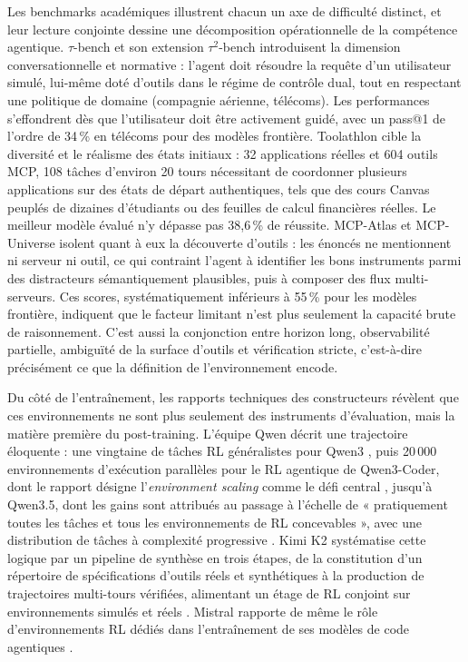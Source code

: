 \documentclass[11pt,a4paper]{article}
\begin{document}
Les benchmarks académiques illustrent chacun un axe de difficulté distinct, et leur lecture conjointe dessine une décomposition opérationnelle de la compétence agentique. $\tau$-bench et son extension $\tau^2$-bench \cite{taubench2024, tau2bench2025} introduisent la dimension conversationnelle et normative : l'agent doit résoudre la requête d'un utilisateur simulé, lui-même doté d'outils dans le régime de contrôle dual, tout en respectant une politique de domaine (compagnie aérienne, télécoms). Les performances s'effondrent dès que l'utilisateur doit être activement guidé, avec un pass@1 de l'ordre de 34\,\% en télécoms pour des modèles frontière. Toolathlon \cite{toolathlon2025} cible la diversité et le réalisme des états initiaux : 32 applications réelles et 604 outils MCP, 108 tâches d'environ 20 tours nécessitant de coordonner plusieurs applications sur des états de départ authentiques, tels que des cours Canvas peuplés de dizaines d'étudiants ou des feuilles de calcul financières réelles. Le meilleur modèle évalué n'y dépasse pas 38,6\,\% de réussite. MCP-Atlas \cite{mcpatlas2026} et MCP-Universe \cite{mcpuniverse2025} isolent quant à eux la découverte d'outils : les énoncés ne mentionnent ni serveur ni outil, ce qui contraint l'agent à identifier les bons instruments parmi des distracteurs sémantiquement plausibles, puis à composer des flux multi-serveurs. Ces scores, systématiquement inférieurs à 55\,\% pour les modèles frontière, indiquent que le facteur limitant n'est plus seulement la capacité brute de raisonnement. C'est aussi la conjonction entre horizon long, observabilité partielle, ambiguïté de la surface d'outils et vérification stricte, c'est-à-dire précisément ce que la définition de l'environnement encode.

Du côté de l'entraînement, les rapports techniques des constructeurs révèlent que ces environnements ne sont plus seulement des instruments d'évaluation, mais la matière première du post-training. L'équipe Qwen décrit une trajectoire éloquente : une vingtaine de tâches RL généralistes pour Qwen3 \cite{qwen3_2025}, puis 20\,000 environnements d'exécution parallèles pour le RL agentique de Qwen3-Coder, dont le rapport désigne l'\emph{environment scaling} comme le défi central \cite{qwen3coder2025}, jusqu'à Qwen3.5, dont les gains sont attribués au passage à l'échelle de « pratiquement toutes les tâches et tous les environnements de RL concevables », avec une distribution de tâches à complexité progressive \cite{qwen35_2026}. Kimi K2 systématise cette logique par un pipeline de synthèse en trois étapes, de la constitution d'un répertoire de spécifications d'outils réels et synthétiques à la production de trajectoires multi-tours vérifiées, alimentant un étage de RL conjoint sur environnements simulés et réels \cite{kimik2_2025}. Mistral rapporte de même le rôle d'environnements RL dédiés dans l'entraînement de ses modèles de code agentiques \cite{magistral2025}.
\end{document}
